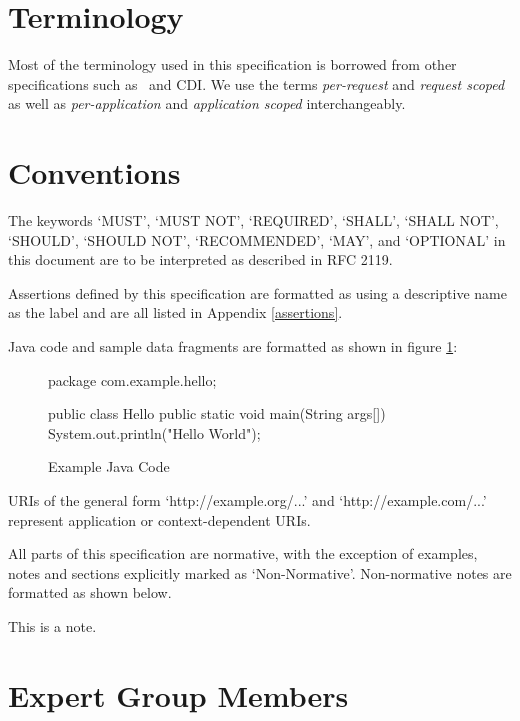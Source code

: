 \section{Terminology}
\label{terminology}

Most of the terminology used in this specification is borrowed from other specifications 
such as \jaxrs\ and CDI. We use the terms {\em per-request} and {\em request scoped} as
well as {\em per-application} and {\em application scoped} interchangeably.

\section{Conventions}

The keywords `MUST', `MUST NOT', `REQUIRED', `SHALL', `SHALL NOT', `SHOULD', `SHOULD NOT', 
`RECOMMENDED', `MAY', and `OPTIONAL' in this document are to be interpreted as described in 
RFC 2119\cite{rfc2119}. 

Assertions defined by this specification are formatted as {\textbf{\rrb}} 
using a descriptive name as the label and are all listed in Appendix \ref{assertions}.

Java code and sample data fragments are formatted as shown in figure \ref{ex1}:

\begin{figure}[hbtp]
\caption{Example Java Code}
\label{ex1}
\begin{listing}{1}
package com.example.hello;

public class Hello {
    public static void main(String args[]) {
        System.out.println("Hello World");
    }
}\end{listing}
\end{figure}

URIs of the general form `http://example.org/...' and `http://example.com/...' represent application 
or context-dependent URIs.

All parts of this specification are normative, with the exception of examples, notes and sections
explicitly marked as `Non-Normative'. Non-normative notes are formatted as shown below.

\begin{nnnote*}
This is a note.
\end{nnnote*}

\section{Expert Group Members} 
\label{expert_group}

